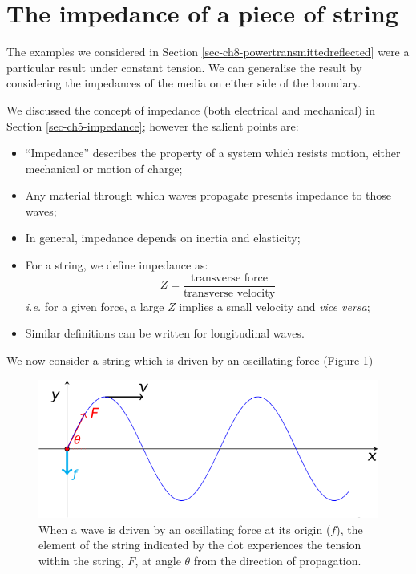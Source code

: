 \documentclass[
]{book}
\providecommand{\tightlist}{%
  \setlength{\itemsep}{0pt}\setlength{\parskip}{0pt}}
\begin{document}
\hypertarget{sec-ch8-stringimpedeance}{%
\section{The impedance of a piece of string}\label{sec-ch8-stringimpedeance}}

The examples we considered in Section \ref{sec-ch8-powertransmittedreflected} were a particular result under constant tension. We can generalise the result by considering the impedances of the media on either side of the boundary.

We discussed the concept of impedance (both electrical and mechanical) in Section \ref{sec-ch5-impedance}; however the salient points are:

\begin{itemize}
\tightlist
\item
  ``Impedance'' describes the property of a system which resists motion, either mechanical or motion of charge;
\item
  Any material through which waves propagate presents impedance to those waves;
\item
  In general, impedance depends on inertia and elasticity;
\item
  For a string, we define impedance as:
  \begin{equation}
  Z = \frac{\textrm{transverse force}}{\textrm{transverse velocity}}
  \end{equation}
  \emph{i.e.} for a given force, a large \(Z\) implies a small velocity and \emph{vice versa};
\item
  Similar definitions can be written for longitudinal waves.
\end{itemize}

We now consider a string which is driven by an oscillating force (Figure \ref{fig:ch8-impedencestring1})

\begin{figure}

{\centering \includegraphics[width=0.7\linewidth]{visualisations/LaTeX/ch8-wavesonstrings3} 

}

\caption{When a wave is driven by an oscillating force at its origin ($f$), the element of the string indicated by the dot experiences the tension within the string, $F$, at angle $\theta$ from the direction of propagation.}\label{fig:ch8-impedencestring1}
\end{figure}
\end{document}
